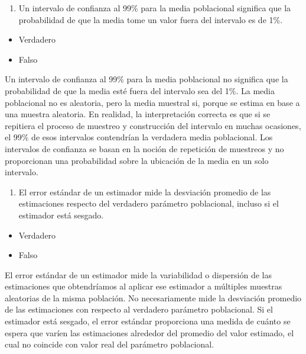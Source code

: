 \documentclass[
  letterpaper,
  DIV=11,
  numbers=noendperiod]{scrartcl}
\providecommand{\tightlist}{%
  \setlength{\itemsep}{0pt}\setlength{\parskip}{0pt}}\usepackage{longtable,booktabs,array}
\begin{document}
\begin{enumerate}
\def\labelenumi{\roman{enumi}.}
\tightlist
\item
  Un intervalo de confianza al 99\% para la media poblacional significa
  que la probabilidad de que la media tome un valor fuera del intervalo
  es de 1\%.
\end{enumerate}

\begin{itemize}
\tightlist
\item[$\square$]
  Verdadero
\item[$\boxtimes$]
  Falso
\end{itemize}

Un intervalo de confianza al 99\% para la media poblacional no significa
que la probabilidad de que la media esté fuera del intervalo sea del
1\%. La media poblacional no es aleatoria, pero la media muestral si,
porque se estima en base a una muestra aleatoria. En realidad, la
interpretación correcta es que si se repitiera el proceso de muestreo y
construcción del intervalo en muchas ocasiones, el 99\% de esos
intervalos contendrían la verdadera media poblacional. Los intervalos de
confianza se basan en la noción de repetición de muestreos y no
proporcionan una probabilidad sobre la ubicación de la media en un solo
intervalo.

\begin{enumerate}
\def\labelenumi{\roman{enumi}.}
\setcounter{enumi}{1}
\tightlist
\item
  El error estándar de un estimador mide la desviación promedio de las
  estimaciones respecto del verdadero parámetro poblacional, incluso si
  el estimador está sesgado.
\end{enumerate}

\begin{itemize}
\tightlist
\item[$\square$]
  Verdadero
\item[$\boxtimes$]
  Falso
\end{itemize}

El error estándar de un estimador mide la variabilidad o dispersión de
las estimaciones que obtendríamos al aplicar ese estimador a múltiples
muestras aleatorias de la misma población. No necesariamente mide la
desviación promedio de las estimaciones con respecto al verdadero
parámetro poblacional. Si el estimador está sesgado, el error estándar
proporciona una medida de cuánto se espera que varíen las estimaciones
alrededor del promedio del valor estimado, el cual no coincide con valor
real del parámetro poblacional.
\end{document}
